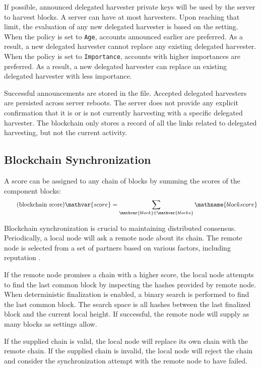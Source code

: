 If possible, announced delegated harvester private keys will be used by the server to harvest blocks.
A server can have at most  harvesters.
Upon reaching that limit, the evaluation of any new delegated harvester is based on the  setting.
When the policy is set to \texttt{Age}, accounts announced earlier are preferred.
As a result, a new delegated harvester cannot replace any existing delegated harvester.
When the policy is set to \texttt{Importance}, accounts with higher importances are preferred.
As a result, a new delegated harvester can replace an existing delegated harvester with less importance.

Successful announcements are stored in the  file.
Accepted delegated harvesters are persisted across server reboots.
The server does not provide any explicit confirmation that it is or is not currently harvesting with a specific delegated harvester.
The blockchain only stores a record of all the links related to delegated harvesting, but not the current activity.

\subsection{Blockchain Synchronization}
\label{sec:blockchain:sync}

A score can be assigned to any chain of blocks by summing the scores of the component blocks:
\begin{equation}
	\tag{blockchain score} \mathvar{score} = \sum_{\mathvar{block} \in \mathvar{blocks}} \mathname{block score}
\end{equation}

Blockchain synchronization is crucial to maintaining distributed consensus.
Periodically, a local node will ask a remote node about its chain.
The remote node is selected from a set of partners based on various factors, including reputation .

If the remote node promises a chain with a higher score, the local node attempts to find the last common block by inspecting the hashes provided by remote node.
When deterministic finalization is enabled, a binary search is performed to find the last common block.
The search space is all hashes between the last finalized block and the current local height.
If successful, the remote node will supply as many blocks as settings allow.

If the supplied chain is valid, the local node will replace its own chain with the remote chain.
If the supplied chain is invalid, the local node will reject the chain and consider the synchronization attempt with the remote node to have failed.

